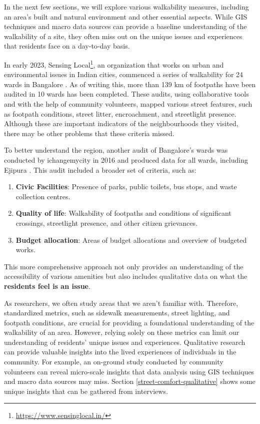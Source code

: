 \documentclass[
]{latex/krantz}
\providecommand{\tightlist}{%
  \setlength{\itemsep}{0pt}\setlength{\parskip}{0pt}}
\renewcommand{\href}[2]{#2\footnote{\url{#1}}}
\DeclareRobustCommand{\href}[2]{#2\footnote{\url{#1}}}
\begin{document}
In the next few sections, we will explore various walkability measures, including an area's built and natural environment and other essential aspects. While GIS techniques and macro data sources can provide a baseline understanding of the walkability of a site, they often miss out on the unique issues and experiences that residents face on a day-to-day basis.

In early 2023, \href{https://www.sensinglocal.in/}{Sensing Local}, an organization that works on urban and environmental issues in Indian cities, commenced a series of walkability for 24 wards in Bangalore \autocite{byiffathRaisingStreets2022}. As of writing this, more than 139 km of footpaths have been audited in 10 wards has been completed. These audits, using collaborative tools and with the help of community volunteers, mapped various street features, such as footpath conditions, street litter, encroachment, and streetlight presence. Although these are important indicators of the neighbourhoods they visited, there may be other problems that these criteria missed.

To better understand the region, another audit of Bangalore's wards was conducted by ichangemycity in 2016 and produced data for all wards, including Ejipura \autocite{ichangemycityEjipuraWard1482016}. This audit included a broader set of criteria, such as:

\begin{enumerate}
\def\labelenumi{\arabic{enumi}.}
\tightlist
\item
  \textbf{Civic Facilities}: Presence of parks, public toilets, bus stops, and waste collection centres.
\item
  \textbf{Quality of life}: Walkability of footpaths and conditions of significant crossings, streetlight presence, and other citizen grievances.
\item
  \textbf{Budget allocation}: Areas of budget allocations and overview of budgeted works.
\end{enumerate}

This more comprehensive approach not only provides an understanding of the accessibility of various amenities but also includes qualitative data on what the \textbf{residents feel is an issue}.

As researchers, we often study areas that we aren't familiar with. Therefore, standardized metrics, such as sidewalk measurements, street lighting, and footpath conditions, are crucial for providing a foundational understanding of the walkability of an area. However, relying solely on these metrics can limit our understanding of residents' unique issues and experiences. Qualitative research can provide valuable insights into the lived experiences of individuals in the community. For example, an on-ground study conducted by community volunteers can reveal micro-scale insights that data analysis using GIS techniques and macro data sources may miss. Section \ref{street-comfort-qualitative} shows some unique insights that can be gathered from interviews.
\end{document}
